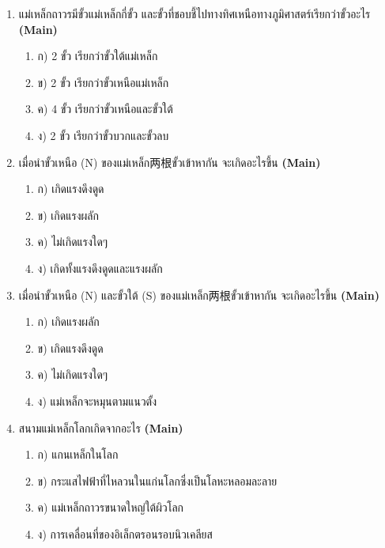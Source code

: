 \documentclass[12pt]{article}
\begin{document}
\begin{enumerate}[label=\arabic*.]
\begin{enumerate}[label=)]
\item ก) บริเวณกลางระหว่างขั้วทั้งสอง
\item ข) บริเวณใกล้ขั้วแม่เหล็กทั้งสอง
\item ค) บริเวณไกลจากขั้วแม่เหล็ก
\item ง) บริเวณรอบแม่เหล็กทุกจุดมีสนามแม่เหล็กเท่ากัน
\end{enumerate}
\item แม่เหล็กถาวรมีขั้วแม่เหล็กกี่ขั้ว และขั้วที่ชอบชี้ไปทางทิศเหนือทางภูมิศาสตร์เรียกว่าขั้วอะไร \hfill \textbf{\small (Main)}
\begin{enumerate}[label=)]
\item ก) 2 ขั้ว เรียกว่าขั้วใต้แม่เหล็ก
\item ข) 2 ขั้ว เรียกว่าขั้วเหนือแม่เหล็ก
\item ค) 4 ขั้ว เรียกว่าขั้วเหนือและขั้วใต้
\item ง) 2 ขั้ว เรียกว่าขั้วบวกและขั้วลบ
\end{enumerate}
\item เมื่อนำขั้วเหนือ (N) ของแม่เหล็ก两根ขั้วเข้าหากัน จะเกิดอะไรขึ้น \hfill \textbf{\small (Main)}
\begin{enumerate}[label=)]
\item ก) เกิดแรงดึงดูด
\item ข) เกิดแรงผลัก
\item ค) ไม่เกิดแรงใดๆ
\item ง) เกิดทั้งแรงดึงดูดและแรงผลัก
\end{enumerate}
\item เมื่อนำขั้วเหนือ (N) และขั้วใต้ (S) ของแม่เหล็ก两根ขั้วเข้าหากัน จะเกิดอะไรขึ้น \hfill \textbf{\small (Main)}
\begin{enumerate}[label=)]
\item ก) เกิดแรงผลัก
\item ข) เกิดแรงดึงดูด
\item ค) ไม่เกิดแรงใดๆ
\item ง) แม่เหล็กจะหมุนตามแนวตั้ง
\end{enumerate}
\item สนามแม่เหล็กโลกเกิดจากอะไร \hfill \textbf{\small (Main)}
\begin{enumerate}[label=)]
\item ก) แกนเหล็กในโลก
\item ข) กระแสไฟฟ้าที่ไหลวนในแก่นโลกซึ่งเป็นโลหะหลอมละลาย
\item ค) แม่เหล็กถาวรขนาดใหญ่ใต้ผิวโลก
\item ง) การเคลื่อนที่ของอิเล็กตรอนรอบนิวเคลียส
\end{enumerate}

\end{enumerate}
\end{document}
